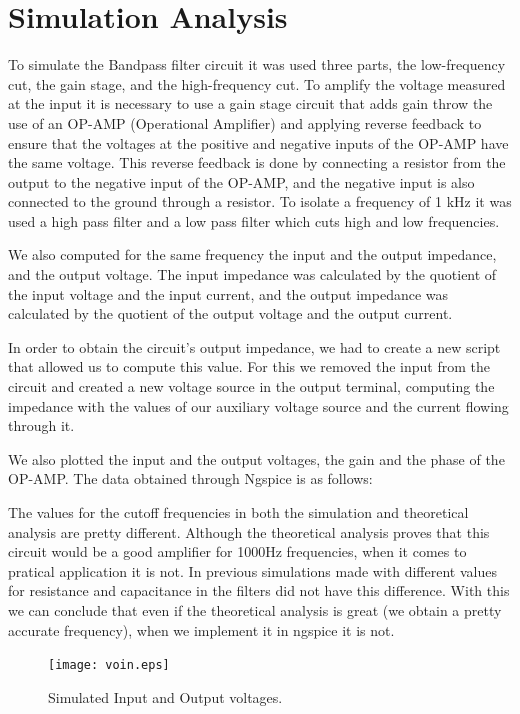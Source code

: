 \section{Simulation Analysis}
\label{sec:simulation}
To simulate the Bandpass filter circuit it was used three parts, the low-frequency cut, the gain stage, and the high-frequency cut.
To amplify the voltage measured at the input it is necessary to use a gain stage circuit that adds gain throw the use of an OP-AMP (Operational Amplifier) and applying reverse feedback to ensure that the voltages at the positive and negative inputs of the OP-AMP have the same voltage. This reverse feedback is done by connecting a resistor from the output to the negative input of the OP-AMP, and the negative input is also connected to the ground through a resistor.
To isolate a frequency of 1 kHz it was used a high pass filter and a low pass filter which cuts high and low frequencies.

We also computed for the same frequency the input and the output impedance, and the output voltage. The input impedance was calculated by the quotient of the input voltage and the input current, and the output impedance was calculated by the quotient of the output voltage and the output current.

In order to obtain the circuit's output impedance, we had to create a new script that allowed us to compute this value. For this we removed the input from the circuit and created a new voltage source in the output terminal, computing the impedance with the values of our auxiliary voltage source and the current flowing through it.

We also plotted the input and the output voltages, the gain and the phase of the OP-AMP.
The data obtained through Ngspice is as follows:

The values for the cutoff frequencies in both the simulation and theoretical analysis are pretty different. Although the theoretical analysis proves that this circuit would be a good amplifier for 1000Hz frequencies, when it comes to pratical application it is not. In previous simulations made with different values for resistance and capacitance in the filters did not have this difference. With this we can conclude that even if the theoretical analysis is great (we obtain a pretty accurate frequency), when we implement it in ngspice it is not.

\begin{figure}[h] 
\centering
\texttt{[image: voin.eps]}
\caption{Simulated Input and Output voltages.}
\label{Fig3: InOutvoltage}
\end{figure}

